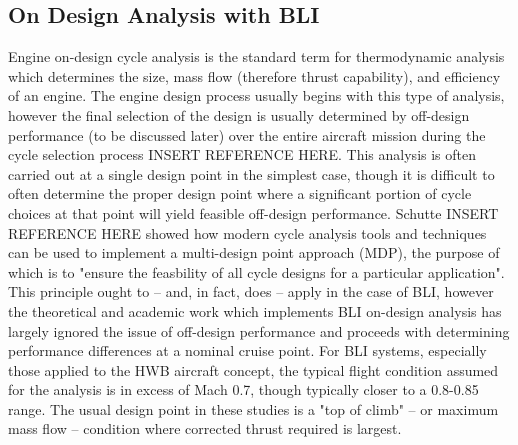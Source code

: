 \subsection{On Design Analysis with BLI}

Engine on-design cycle analysis is the standard term for thermodynamic analysis which determines the size, mass flow (therefore thrust capability), and efficiency of an engine.  The engine design process usually begins with this type of analysis, however the final selection of the design is usually determined by off-design performance (to be discussed later) over the entire aircraft mission during the cycle selection process INSERT REFERENCE HERE.  This analysis is often carried out at a single design point in the simplest case, though it is difficult to often determine the proper design point where a significant portion of cycle choices at that point will yield feasible off-design performance.  Schutte INSERT REFERENCE HERE showed how modern cycle analysis tools and techniques can be used to implement a multi-design point approach (MDP), the purpose of which is to "ensure the feasbility of all cycle designs for a particular application".  This principle ought to -- and, in fact, does -- apply in the case of BLI, however the theoretical and academic work which implements BLI on-design analysis has largely ignored the issue of off-design performance and proceeds with determining performance differences at a nominal cruise point.  For BLI systems, especially those applied to the HWB aircraft concept, the typical flight condition assumed for the analysis is in excess of Mach 0.7, though typically closer to a 0.8-0.85 range.  The usual design point in these studies is a "top of climb" -- or maximum mass flow -- condition where corrected thrust required is largest.

